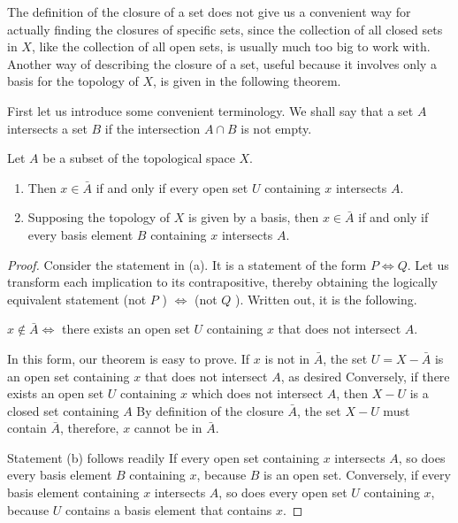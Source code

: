 The definition of the closure of a set does not give us a convenient way for actually finding the closures of specific sets, since the collection of all closed sets in \(X\), like the collection of all open sets, is usually much too big to work with. Another way of describing the closure of a set, useful because it involves only a basis for the topology of \(X\), is given in the following theorem.

First let us introduce some convenient terminology. We shall say that a set \(A\) intersects a set \(B\) if the intersection \(A \cap B\) is not empty.

\begin{theorem}
\label{thm:\thetheorem}
 Let \(A\) be a subset of the topological space \(X\).

 \begin{enumerate}[itemsep=0.2em, parsep=0pt, topsep=0pt, partopsep=0pt, leftmargin=*, label=(\alph*), align=left]
 \item Then \(x \in \bar{A}\) if and only if every open set \(U\) containing \(x\) intersects \(A\).

 \item Supposing the topology of \(X\) is given by a basis, then \(x \in \bar{A}\) if and only if every basis element \(B\) containing \(x\) intersects \(A\).
 \end{enumerate}
\end{theorem}

\begin{proof}
 Consider the statement in (a). It is a statement of the form \(P \Leftrightarrow Q\). Let us transform each implication to its contrapositive, thereby obtaining the logically equivalent statement (not \(P\) ) \(\Leftrightarrow\) (not \(Q\) ). Written out, it is the following.

 \(x \notin \bar{A} \Leftrightarrow\) there exists an open set \(U\) containing \(x\) that does not intersect \(A\).

 In this form, our theorem is easy to prove. If \(x\) is not in \(\bar{A}\), the set \(U = X - \bar{A}\) is an open set containing \(x\) that does not intersect \(A\), as desired Conversely, if there exists an open set \(U\) containing \(x\) which does not intersect \(A\), then \(X - U\) is a closed set containing \(A\) By definition of the closure \(\bar{A}\), the set \(X - U\) must contain \(\bar{A}\), therefore, \(x\) cannot be in \(\bar{A}\).

 Statement (b) follows readily If every open set containing \(x\) intersects \(A\), so does every basis element \(B\) containing \(x\), because \(B\) is an open set. Conversely, if every basis element containing \(x\) intersects \(A\), so does every open set \(U\) containing \(x\), because \(U\) contains a basis element that contains \(x\).
\end{proof}

